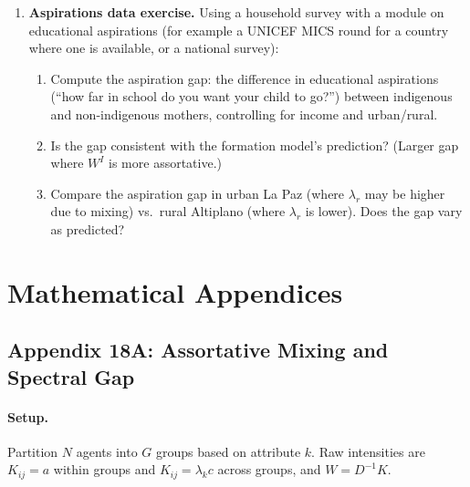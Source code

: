 \documentclass[../structural_economics_book.tex]{subfiles}
\begin{document}
\begin{enumerate}[label=\textbf{18.\arabic*}, leftmargin=3em]
\item \textbf{Aspirations data exercise.} Using a household survey with a module on educational aspirations (for example a UNICEF MICS round for a country where one is available, or a national survey):
\begin{enumerate}
\item Compute the aspiration gap: the difference in educational aspirations (``how far in school do you want your child to go?'') between indigenous and non-indigenous mothers, controlling for income and urban/rural.
\item Is the gap consistent with the formation model's prediction? (Larger gap where $W^I$ is more assortative.)
\item Compare the aspiration gap in urban La Paz (where $\lambda_r$ may be higher due to mixing) vs.\ rural Altiplano (where $\lambda_r$ is lower). Does the gap vary as predicted?
\end{enumerate}
\end{enumerate}


\newpage
\section*{Mathematical Appendices}


\subsection*{Appendix 18A: Assortative Mixing and Spectral Gap}
\label{ch18:app:assortative}

\paragraph{Setup.} Partition $N$ agents into $G$ groups based on attribute $k$. Raw intensities are $K_{ij} = a$ within groups and $K_{ij} = \lambda_k c$ across groups, and $W = D^{-1}K$.
\end{document}
